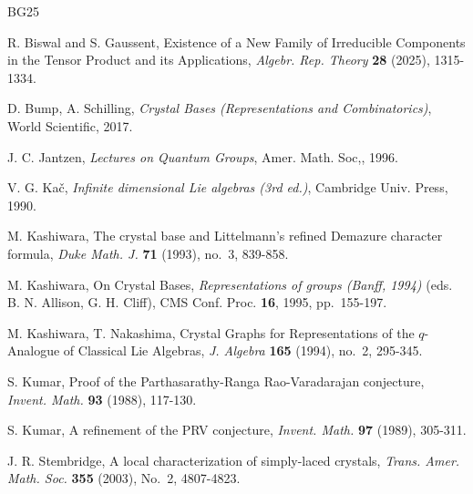 \documentclass[12pt]{amsart}
\numberwithin{equation}{section}
\theoremstyle{definition}
\begin{document}
\begin{thebibliography}{BG25} 

 R. Biswal and S. Gaussent, Existence of a New Family of Irreducible Components in the Tensor Product and its Applications, {\it Algebr. Rep. Theory} {\bf 28} (2025), 1315-1334. 

 D. Bump, A. Schilling, {\it Crystal Bases (Representations and Combinatorics)}, World Scientific, 2017. 

 J. C. Jantzen, {\it Lectures on Quantum Groups}, Amer. Math. Soc,, 1996. 

 V. G. Ka\v{c}, {\it Infinite dimensional Lie algebras (3rd ed.)}, Cambridge Univ. Press, 1990.   

 M. Kashiwara, The crystal base and Littelmann's refined Demazure character formula, 
{\it Duke Math. J.} {\bf 71} (1993), no.~3, 839-858. 

 M. Kashiwara, On Crystal Bases, {\it Representations of groups 
(Banff, 1994)} (eds. B. N. Allison, G. H. Cliff), CMS Conf. Proc. {\bf 16}, 1995, pp.~155-197. 

 M. Kashiwara, T. Nakashima, Crystal Graphs for Representations of the $q$-Analogue of Classical Lie Algebras, {\it J. Algebra} {\bf 165} (1994), no.~2, 295-345. 

 S. Kumar, Proof of the Parthasarathy-Ranga Rao-Varadarajan conjecture, 
{\it Invent. Math.} {\bf 93} (1988), 117-130. 

 S. Kumar, A refinement of the PRV conjecture, {\it Invent. Math.}  {\bf 97} (1989), 305-311. 

 J. R. Stembridge, A local characterization of simply-laced crystals, {\it Trans. Amer. Math. Soc.} 
{\bf 355} (2003), No.~2, 4807-4823. 

\end{thebibliography}
\end{document}
